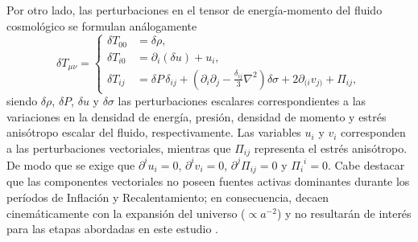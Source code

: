Por otro lado, las perturbaciones en el tensor de energía-momento del fluido cosmológico se formulan análogamente
\begin{equation}
    \delta T_{\mu\nu} = \begin{cases}
         \delta T_{00} &= \delta\rho, \\
         \delta T_{i0} &= \partial_i (\delta u) + u_i, \\
         \delta T_{ij} &= \delta P \, \delta_{ij} + \left( \partial_i \partial_j - \frac{\delta_{ij}}{3} \nabla^2 \right) \delta \sigma + 2 \partial_{(i} v_{j)} + \Pi_{ij},
    \end{cases}
\end{equation}
siendo $\delta \rho$, $\delta P$, $\delta u$ y $\delta \sigma$ las perturbaciones escalares correspondientes a las variaciones en la densidad de energía, presión, densidad de momento y estrés anisótropo escalar del fluido, respectivamente. Las variables $u_i$ y $v_i$ corresponden a las perturbaciones vectoriales, mientras que $\Pi_{ij}$ representa el estrés anisótropo. De modo que se exige que $\partial^i u_i = 0$, $\partial^i v_i = 0$, $\partial^j \Pi_{ij} = 0$ y ${\Pi_i}^i = 0$. Cabe destacar que las componentes vectoriales no poseen fuentes activas dominantes durante los períodos de Inflación y Recalentamiento; en consecuencia, decaen cinemáticamente con la expansión del universo ($\propto a^{-2}$) y no resultarán de interés para las etapas abordadas en este estudio \cite{Weinberg, Peter_2009}.

